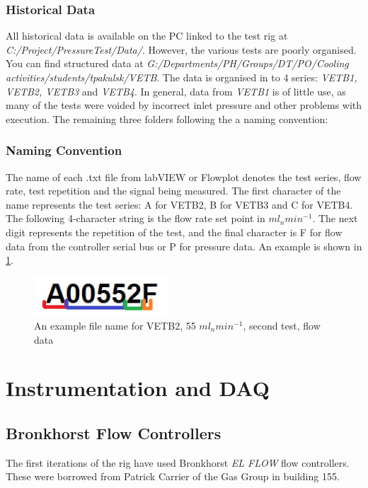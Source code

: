 \documentclass{report}
\begin{document}
\subsubsection{Historical Data}
All historical data is available on the PC linked to the test rig at \textit{C:/Project/PressureTest/Data/}. However, the various tests are poorly organised. You can find structured data at \textit{G:/Departments/PH/Groups/DT/PO/Cooling activities/students/tpakulsk/VETB}. The data is organised in to 4 series: \textit{VETB1, VETB2, VETB3} and \textit{VETB4}. In general, data from \textit{VETB1} is of little use, as many of the tests were voided by incorrect inlet pressure and other problems with execution. The remaining three folders following the a naming convention:\\
\subsubsection{Naming Convention}
The name of each .txt file from labVIEW or Flowplot denotes the test series, flow rate, test repetition and the signal being measured. The first character of the name represents the test series: A for VETB2, B for VETB3 and C for VETB4. The following 4-character string is the flow rate set point in $ml_nmin^{-1}$. The next digit represents the repetition of the test, and the final character is F for flow data from the controller serial bus or P for pressure data. An example is shown in \ref{namingConvention}.

\begin{figure}[h]
\includegraphics[width = 5cm]{namingConvention}
\caption{An example file name for VETB2, 55 $ml_nmin^{-1}$, second test, flow data}
\label{namingConvention}
\end{figure}



\section{Instrumentation and DAQ}
\subsection{Bronkhorst Flow Controllers}
The first iterations of the rig have used Bronkhorst \textit{EL FLOW} flow controllers. These were borrowed from Patrick Carrier of the Gas Group in building 155. 
\end{document}

